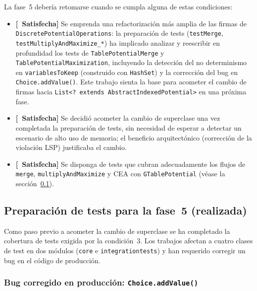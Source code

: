 \documentclass[11pt,a4paper]{article}
\newcommand{\code}[1]{\texttt{#1}}
\begin{document}
La fase~5 debería retomarse cuando se cumpla alguna de estas condiciones:

\begin{itemize}
  \item \textbf{[\checkmark~Satisfecha]} Se emprenda una refactorización más
        amplia de las firmas de \code{Discrete\-Potential\-Operations}: la
        preparación de tests (\code{testMerge},
        \code{test\-Multiply\-And\-Maximize\_*}) ha implicado analizar y reescribir
        en profundidad los tests de \code{Table\-Potential\-Merge} y
        \code{Table\-Potential\-Maximization}, incluyendo la detección del no
        determinismo en \code{variables\-To\-Keep} (construido con \code{HashSet}) y
        la corrección del bug en \code{Choice.\-addValue()}.  Este trabajo sienta
        la base para acometer el cambio de firmas hacia
        \code{List<? extends Abstract\-Indexed\-Potential>} en una próxima fase.
  \item \textbf{[\checkmark~Satisfecha]} Se decidió acometer la cambio de superclase
        una vez completada la preparación de tests, sin necesidad de esperar a
        detectar un escenario de alto uso de memoria; el beneficio arquitectónico
        (corrección de la violación LSP) justificaba el cambio.
  \item \textbf{[\checkmark~Satisfecha]} Se disponga de tests que cubran adecuadamente
        los flujos de \code{merge}, \code{multiplyAndMaximize} y CEA con
        \code{GTablePotential} (véase la sección~\ref{sec:fase5-tests}).
\end{itemize}

\subsection{Preparación de tests para la fase~5 (realizada)}
\label{sec:fase5-tests}

Como paso previo a acometer la cambio de superclase se ha completado la cobertura de
tests exigida por la condición~3.  Los trabajos afectan a cuatro clases de test
en dos módulos (\code{core} e \code{integrationtests}) y han requerido corregir
un bug en el código de producción.

\subsubsection*{Bug corregido en producción: \code{Choice.addValue()}}
\end{document}
